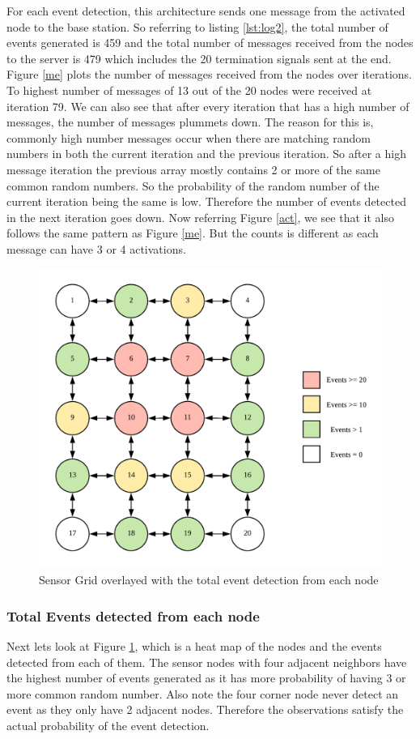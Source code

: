 \documentclass[conference]{IEEEtran}
\begin{document}
	 For each event detection, this architecture sends one message from the activated node to the base station. So referring to listing \ref{lst:log2}, the total number of events generated is 459 and the total number of messages received from the nodes to the server is 479 which includes the 20 termination signals sent at the end. Figure \ref{me} plots the number of messages received from the nodes over iterations. To highest number of messages of 13 out of the 20 nodes were received at iteration 79. We can also see that after every iteration that has a high number of messages, the number of messages plummets down. The reason for this is, commonly high number messages occur when there are matching random numbers in both the current iteration and the previous iteration. So after a high message iteration the previous array mostly contains 2 or more of the same common random numbers. So the probability of the random number of the current iteration being the same is low. Therefore the number of events detected in the next iteration goes down. Now referring  Figure \ref{act}, we see that it also follows the same pattern as Figure \ref{me}. But the counts is different as each message can have 3 or 4 activations.
	 
	 \begin{figure}[!h]
	 	\centering
	 	\includegraphics[width=3.in,keepaspectratio]{gridsum}
	 	\caption{Sensor Grid overlayed with the total event detection from each node}
	 	\label{colgrid}
	 \end{figure}
 
	\subsubsection{Total Events detected from each node}
	Next lets look at Figure \ref{colgrid}, which is a heat map of the nodes and the events detected from each of them. The sensor nodes with four adjacent neighbors have the highest number of events generated as it has more probability of having 3 or more common random number. Also note the four corner node never 
	detect an event as they only have 2 adjacent nodes. Therefore the observations satisfy the actual probability of the event detection.
	
\end{document}
